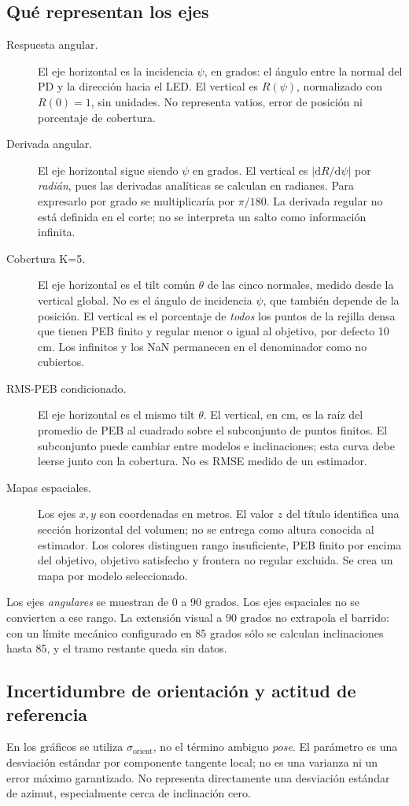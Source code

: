 \documentclass[11pt,a4paper]{article}
\begin{document}
\subsection{Qué representan los ejes}
\begin{description}
\item[Respuesta angular.] El eje horizontal es la incidencia $\psi$, en grados: el ángulo entre la normal del PD y la dirección hacia el LED. El vertical es $R(\psi)$, normalizado con $R(0)=1$, sin unidades. No representa vatios, error de posición ni porcentaje de cobertura.
\item[Derivada angular.] El eje horizontal sigue siendo $\psi$ en grados. El vertical es $|\mathrm dR/\mathrm d\psi|$ por \emph{radián}, pues las derivadas analíticas se calculan en radianes. Para expresarlo por grado se multiplicaría por $\pi/180$. La derivada regular no está definida en el corte; no se interpreta un salto como información infinita.
\item[Cobertura K=5.] El eje horizontal es el tilt común $\theta$ de las cinco normales, medido desde la vertical global. No es el ángulo de incidencia $\psi$, que también depende de la posición. El vertical es el porcentaje de \emph{todos} los puntos de la rejilla densa que tienen PEB finito y regular menor o igual al objetivo, por defecto 10 cm. Los infinitos y los NaN permanecen en el denominador como no cubiertos.
\item[RMS-PEB condicionado.] El eje horizontal es el mismo tilt $\theta$. El vertical, en cm, es la raíz del promedio de PEB al cuadrado sobre el subconjunto de puntos finitos. El subconjunto puede cambiar entre modelos e inclinaciones; esta curva debe leerse junto con la cobertura. No es RMSE medido de un estimador.
\item[Mapas espaciales.] Los ejes $x,y$ son coordenadas en metros. El valor $z$ del título identifica una sección horizontal del volumen; no se entrega como altura conocida al estimador. Los colores distinguen rango insuficiente, PEB finito por encima del objetivo, objetivo satisfecho y frontera no regular excluida. Se crea un mapa por modelo seleccionado.
\end{description}
Los ejes \emph{angulares} se muestran de 0 a 90 grados. Los ejes espaciales no se convierten a ese rango. La extensión visual a 90 grados no extrapola el barrido: con un límite mecánico configurado en 85 grados sólo se calculan inclinaciones hasta 85, y el tramo restante queda sin datos.

\subsection{Incertidumbre de orientación y actitud de referencia}
En los gráficos se utiliza $\sigma_{\mathrm{orient}}$, no el término ambiguo \emph{pose}. El parámetro  es una desviación estándar por componente tangente local; no es una varianza ni un error máximo garantizado. No representa directamente una desviación estándar de azimut, especialmente cerca de inclinación cero.
\end{document}
